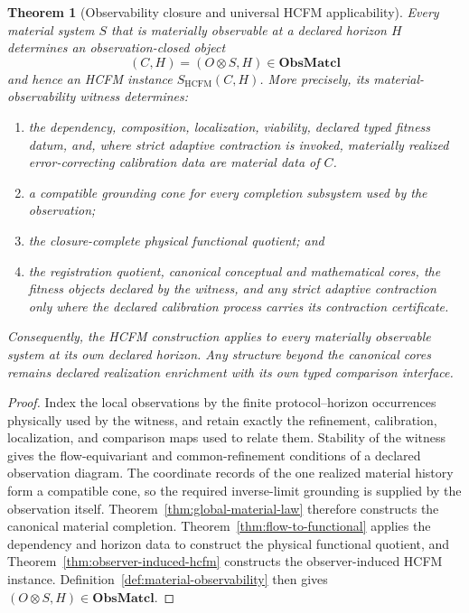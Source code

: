 \documentclass[11pt]{article}
\newtheorem{theorem}{Theorem}
\theoremstyle{definition}
\newcommand{\ObsMatcl}{\mathbf{ObsMatcl}}
\begin{document}
\begin{theorem}[Observability closure and universal HCFM applicability] \label{thm:observability-closure} Every material system \(S\) that is materially observable at a declared horizon \(H\) determines an observation-closed object \[ (C,H)=(O\otimes S,H)\in\ObsMatcl \] and hence an HCFM instance \(S_{\mathrm{HCFM}}(C,H)\). More precisely, its material-observability witness determines: \begin{enumerate}[label=(\alph*)] 
\item the dependency, composition, localization, viability, declared typed fitness datum, and, where strict adaptive contraction is invoked, materially realized error-correcting calibration data are material data of \(C\).
\item a compatible grounding cone for every completion subsystem used by the observation; 
\item the closure-complete physical functional quotient; and 
\item the registration quotient, canonical conceptual and mathematical cores, the fitness objects declared by the witness, and any strict adaptive contraction only where the declared calibration process carries its contraction certificate.
\end{enumerate} Consequently, the HCFM construction applies to every materially observable system at its own declared horizon. Any structure beyond the canonical cores remains declared realization enrichment with its own typed comparison interface. \end{theorem} \begin{proof} Index the local observations by the finite protocol--horizon occurrences physically used by the witness, and retain exactly the refinement, calibration, localization, and comparison maps used to relate them. Stability of the witness gives the flow-equivariant and common-refinement conditions of a declared observation diagram. The coordinate records of the one realized material history form a compatible cone, so the required inverse-limit grounding is supplied by the observation itself. Theorem~\ref{thm:global-material-law} therefore constructs the canonical material completion. Theorem~\ref{thm:flow-to-functional} applies the dependency and horizon data to construct the physical functional quotient, and Theorem~\ref{thm:observer-induced-hcfm} constructs the observer-induced HCFM instance. Definition~\ref{def:material-observability} then gives \((O\otimes S,H)\in\ObsMatcl\). \end{proof} 
\end{document}
